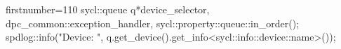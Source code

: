 \begin{cppcode*}{firstnumber=110}
        sycl::queue q{*device_selector, dpc_common::exception_handler, sycl::property::queue::in_order()};
        spdlog::info("Device: {}", q.get_device().get_info<sycl::info::device::name>());
\end{cppcode*}
